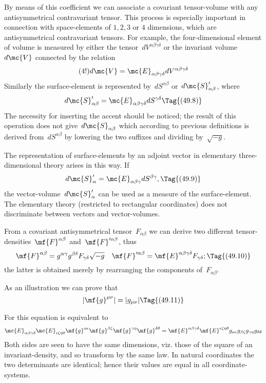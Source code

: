 \documentclass[12pt]{book}
\begin{document}
By means of this coefficient we can associate a covariant tensor-volume with any antisymmetrical contravariant tensor.
This process is especially important in connection with space-elements of $1,2,3$ or $4$ dimensions, which are
antisymmetrical contravariant tensors.
For example, the four-dimensional element of volume is measured by either the tensor~$dV^{\alpha\beta\gamma\delta}$
or the invariant volume $d\mc{V}$ connected by the relation
\[
(4!)d\mc{V} = \mc{E}_{\alpha\beta\gamma\delta} dV^{\alpha\beta\gamma\delta}
\]
Similarly the surface-element is represented by~$dS^{\alpha\beta}$ or~$d\mc{S}'_{\alpha\beta}$, where
\[
d\mc{S}'_{\alpha\beta} = \mc{E}_{\alpha\beta\gamma\delta} dS^{\gamma\delta}
\Tag{(49.8)}
\]
The necessity for inserting the accent should be noticed; the result of this operation does not
give~$d\mc{S}_{\alpha\beta}$ which according to previous definitions is derived from~$dS^{\alpha\beta}$ by
lowering the two suffixes and dividing by~$\sqrt{-g}$.

The representation of surface-elements by an adjoint vector in elementary three-dimensional theory arises in this way.
If
\[
d\mc{S}'_\alpha = \mc{E}_{\alpha\beta\gamma} dS^{\beta\gamma},
\Tag{(49.9)}
\]
the vector-volume~$d\mc{S}'_\alpha$ can be used as a measure of the surface-element.
The elementary theory (restricted to rectangular coordinates) does not discriminate between vectors and vector-volumes.

From a covariant antisymmetrical tensor~$F_{\alpha\beta}$ we can derive two different
tensor\hyp{}densities~$\mf{F}^{\alpha\beta}$ and~$\mf{F}'^{\alpha\beta}$, thus
\[
\mf{F}^{\alpha\beta} = g^{\alpha\gamma} g^{\beta\delta} F_{\gamma\delta} \sqrt{-g} \quad \mf{F}'^{\alpha\beta} = \mf{E}^{\alpha\beta\gamma\delta} F_{\gamma\delta};
\Tag{(49.10)}
\]
the latter is obtained merely by rearranging the components of~$F_{\alpha\beta}$.

As an illustration we can prove that
\[
|\mf{g}^{\mu\nu}| = |g_{\mu\nu}|
\Tag{(49.11)}
\]

For this equation is equivalent to
\[
\mc{E}_{\alpha\beta\gamma\delta} \mc{E}_{\epsilon\zeta\eta\theta}
  \mf{g}^{\alpha\epsilon} \mf{g}^{\beta\zeta} \mf{g}^{\gamma\eta} \mf{g}^{\delta\theta} =
\mf{E}^{\alpha\beta\gamma\delta} \mf{E}^{\epsilon\zeta\eta\theta}
  g_{\alpha\epsilon} g_{\beta\zeta} g_{\gamma\eta} g_{\delta\theta}
\]
Both sides are seen to have the same dimensions, viz. those of the square of an invariant-density, and so transform
by the same law.
In natural coordinates the two determinants are identical; hence their values are equal in all coordinate-systems.
\end{document}
